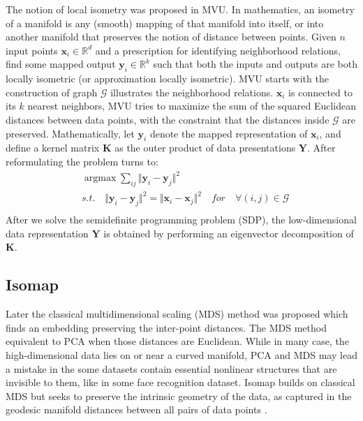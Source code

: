 \documentclass[journal]{IEEEtran}
\DeclareMathOperator*{\argmax}{argmax}
\begin{document}
The notion of local isometry was proposed in MVU.
In mathematics, an isometry of a manifold is any (smooth) mapping of that manifold into itself, or into another manifold that preserves the notion of distance between points. 
Given $n$ input points $\bm{x}_i \in \mathbb{R}^d$ and a prescription for identifying neighborhood relations,  find some mapped output  $\bm{y}_i \in \mathbb{R}^k$ such that both the inputs and outputs are both locally isometric (or approximation locally isometric).
MVU starts with the construction of graph $\mathcal{G}$ illustrates the neighborhood relations. $\bm{x}_i$ is connected to its $k$ nearest neighbors, MVU tries to maximize the sum of the squared Euclidean distances between data points, with the constraint that the distances inside $\mathcal{G}$ are preserved.
Mathematically, let $\bm{y}_i$ denote the mapped representation of $\bm{x}_i$, and define a kernel matrix $\bm{K}$ as the outer product of data presentations $\bm{Y}$. After reformulating the problem turns to:
\begin{equation}
\begin{split}
& \argmax \sum_{ij}\Vert \bm{y}_i - \bm{y}_j \Vert^2  \\
& s.t. \quad  \Vert \bm{y}_i - \bm{y}_j \Vert^2 = \Vert \bm{x}_i - \bm{x}_j \Vert^2 \quad for \quad \forall (i, j) \in \mathcal{G} \\
\end{split}
\end{equation}
After we solve the semidefinite programming problem (SDP), the low-dimensional data representation $\bm{Y}$ is obtained by performing an eigenvector decomposition of $\bm{K}$.




%
%

\subsection{Isomap}
Later the classical multidimensional scaling (MDS) method was proposed which finds an embedding preserving the inter-point distances\cite{Kruskal1978Multidimensional}. 
The MDS method equivalent to PCA when those distances are Euclidean.
While in many case, the high-dimensional data lies on or near a curved manifold, PCA and MDS may lead a mistake in the some datasets contain essential nonlinear structures that are invisible to them, like in some face recognition dataset.
Isomap builds on classical MDS but seeks to preserve the intrinsic geometry of the data, as captured in the geodesic manifold distances between all pairs of data points \cite{tenenbaum2000isomap}. 
\end{document}
